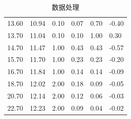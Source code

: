 \documentclass[UTF8,AutoFakeBold]{ctexbook}
\begin{document}
\begin{table}
\begin{tabular}{p{2cm}<{\centering} p{2cm}<{\centering} p{2cm}<{\centering} p{2cm}<{\centering} p{2cm}<{\centering} p{2cm}<{\centering}}
        13.60 & 10.94 & 0.10 & 0.07 & 0.70 & -0.40  \\ 
        13.70 & 11.04 & 0.10 & 0.10 & 1.00 & 0.30  \\ 
        14.70 & 11.47 & 1.00 & 0.43 & 0.43 & -0.57  \\ 
        15.70 & 11.70 & 1.00 & 0.23 & 0.23 & -0.20  \\ 
        16.70 & 11.84 & 1.00 & 0.14 & 0.14 & -0.09  \\ 
        18.70 & 12.02 & 2.00 & 0.18 & 0.09 & -0.05  \\ 
        20.70 & 12.14 & 2.00 & 0.12 & 0.06 & -0.03  \\ 
        22.70 & 12.23 & 2.00 & 0.09 & 0.04 & -0.02  \\ 
        \bottomrule
    \end{tabular}
    \caption{数据处理}
\end{table}
\end{document}
